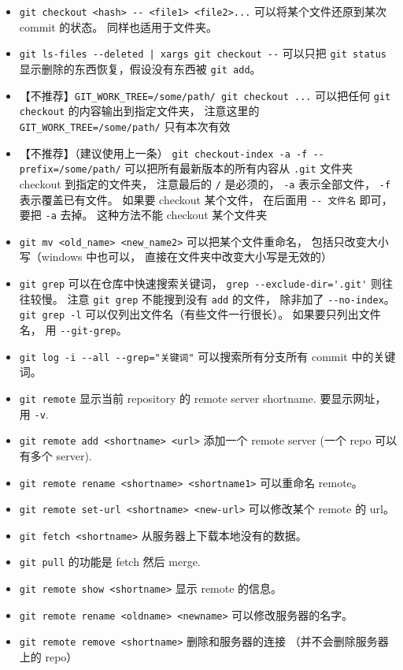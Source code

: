 \begin{itemize}
\item \verb`git checkout <hash> -- <file1> <file2>...` 可以将某个文件还原到某次 commit 的状态。 同样也适用于文件夹。
\item \verb`git ls-files --deleted | xargs git checkout --` 可以只把 \verb`git status` 显示删除的东西恢复，假设没有东西被 \verb`git add`。
\item 【不推荐】\verb`GIT_WORK_TREE=/some/path/ git checkout ...` 可以把任何 \verb`git checkout` 的内容输出到指定文件夹， 注意这里的 \verb`GIT_WORK_TREE=/some/path/` 只有本次有效
\item 【不推荐】（建议使用上一条） \verb`git checkout-index -a -f --prefix=/some/path/` 可以把所有最新版本的所有内容从 \verb`.git` 文件夹 checkout 到指定的文件夹， 注意最后的 \verb`/` 是必须的， \verb`-a` 表示全部文件， \verb`-f` 表示覆盖已有文件。 如果要 checkout 某个文件， 在后面用 \verb`-- 文件名` 即可， 要把 \verb`-a` 去掉。 这种方法不能 checkout 某个文件夹
\item \verb`git mv <old_name> <new_name2>` 可以把某个文件重命名， 包括只改变大小写（windows 中也可以， 直接在文件夹中改变大小写是无效的）
\item \verb`git grep` 可以在仓库中快速搜索关键词， \verb`grep --exclude-dir='.git'` 则往往较慢。 注意 \verb`git grep` 不能搜到没有 \verb`add` 的文件， 除非加了 \verb`--no-index`。 \verb`git grep -l` 可以仅列出文件名（有些文件一行很长）。 如果要只列出文件名， 用 \verb`--git-grep`。
\item \verb`git log -i --all --grep="关键词"` 可以搜索所有分支所有 commit 中的关键词。
\item \verb`git remote` 显示当前 repository 的 remote server shortname. 要显示网址， 用 \verb`-v`.
\item \verb`git remote add <shortname> <url>` 添加一个 remote server (一个 repo 可以有多个 server).
\item \verb`git remote rename <shortname> <shortname1>` 可以重命名 remote。
\item \verb`git remote set-url <shortname> <new-url>` 可以修改某个 remote 的 url。
\item \verb`git fetch <shortname>` 从服务器上下载本地没有的数据。
\item \verb`git pull` 的功能是 fetch 然后 merge.
\item \verb`git remote show <shortname>` 显示 remote 的信息。
\item \verb`git remote rename <oldname> <newname>` 可以修改服务器的名字。
\item \verb`git remote remove <shortname>` 删除和服务器的连接 （并不会删除服务器上的 repo）

\end{itemize}
